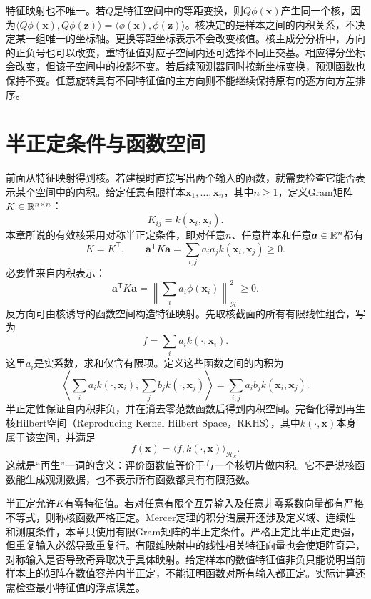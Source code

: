 特征映射也不唯一。若$Q$是特征空间中的等距变换，则$Q\phi(\bm x)$产生同一个核，因为$\langle Q\phi(\bm x),Q\phi(\bm z)\rangle=\langle\phi(\bm x),\phi(\bm z)\rangle$。核决定的是样本之间的内积关系，不决定某一组唯一的坐标轴。更换等距坐标表示不会改变核值。核主成分分析中，方向的正负号也可以改变，重特征值对应子空间内还可选择不同正交基。相应得分坐标会改变，但该子空间中的投影不变。若后续预测器同时按新坐标变换，预测函数也保持不变。任意旋转具有不同特征值的主方向则不能继续保持原有的逐方向方差排序。

\section{半正定条件与函数空间}
前面从特征映射得到核。若建模时直接写出两个输入的函数，就需要检查它能否表示某个空间中的内积。给定任意有限样本$\bm x_1,\ldots,\bm x_n$，其中$n\ge1$，定义Gram矩阵$K\in\mathbb{R}^{n\times n}$：
\begin{equation}
 K_{ij}=k(\bm x_i,\bm x_j).
\end{equation}
本章所说的有效核采用对称半正定条件，即对任意$n$、任意样本和任意$\bm a\in\mathbb{R}^n$都有
\begin{equation}
 K=K^{\mathsf T},\qquad
 \bm a^{\mathsf T}K\bm a=\sum_{i,j}a_ia_jk(\bm x_i,\bm x_j)\geq0.
 \label{eq:kernel-psd-condition}
\end{equation}
必要性来自内积表示：
\begin{equation}
 \bm a^{\mathsf T}K\bm a
 =\left\|\sum_i a_i\phi(\bm x_i)\right\|_{\mathcal H}^2\geq0.
\end{equation}
反方向可由核诱导的函数空间构造特征映射。先取核截面的所有有限线性组合，写为
\[
 f=\sum_i a_i k(\cdot,\bm x_i).
\]
这里$a_i$是实系数，求和仅含有限项。定义这些函数之间的内积为
\begin{equation}
 \left\langle\sum_i a_i k(\cdot,\bm x_i),
 \sum_j b_j k(\cdot,\bm x_j)\right\rangle
 =\sum_{i,j}a_ib_jk(\bm x_i,\bm x_j).
\end{equation}
半正定性保证自内积非负，并在消去零范数函数后得到内积空间。完备化得到再生核Hilbert空间（Reproducing Kernel Hilbert Space，RKHS），其中$k(\cdot,\bm x)$本身属于该空间，并满足
\begin{equation}
 f(\bm x)=\langle f,k(\cdot,\bm x)\rangle_{\mathcal H_k}.
 \label{eq:reproducing-property}
\end{equation}
这就是“再生”一词的含义：评价函数值等价于与一个核切片做内积。它不是说核函数能生成观测数据，也不表示所有函数都具有有限范数。

半正定允许$K$有零特征值。若对任意有限个互异输入及任意非零系数向量都有严格不等式，则称核函数严格正定。Mercer定理的积分谱展开还涉及定义域、连续性和测度条件，本章只使用有限Gram矩阵的半正定条件。严格正定比半正定更强，但重复输入必然导致重复行。有限维映射中的线性相关特征向量也会使矩阵奇异，对称输入是否导致奇异取决于具体映射。给定样本的数值特征值非负只能说明当前样本上的矩阵在数值容差内半正定，不能证明函数对所有输入都正定。实际计算还需检查最小特征值的浮点误差。

